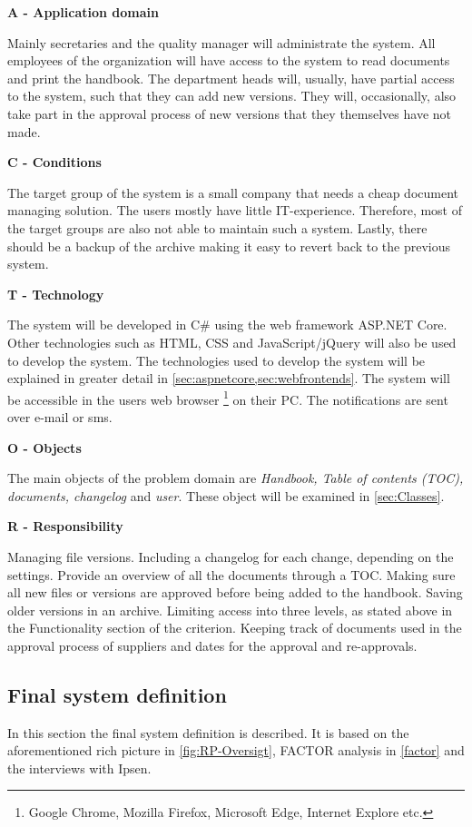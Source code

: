\noindent\textbf{A - Application domain}

Mainly secretaries and the quality manager will administrate the system.
All employees of the organization will have access to the system to read documents and print the handbook.
The department heads will, usually, have partial access to the system, such that they can add new versions.
They will, occasionally, also take part in the approval process of new versions that they themselves have not made.

\noindent\textbf{C - Conditions} \label{sec:conditions}

The target group of the system is a small company that needs a cheap document managing solution.
The users mostly have little IT-experience.
Therefore, most of the target groups are also not able to maintain such a system.
Lastly, there should be a backup of the archive making it easy to revert back to the previous system.

\noindent\textbf{T - Technology}

The system will be developed in C\# using the web framework ASP.NET Core.
Other technologies such as HTML, CSS and JavaScript/jQuery will also be used to develop the system.
The technologies used to develop the system will be explained in greater detail in \cref{sec:aspnetcore,sec:webfrontends}.
The system will be accessible in the users web browser \footnote{Google Chrome, Mozilla Firefox, Microsoft Edge, Internet Explore etc.} on their PC.
The notifications are sent over e-mail or sms.

\noindent\textbf{O - Objects}

The main objects of the problem domain are \textit{Handbook, Table of contents (TOC), documents, changelog} and \textit{user}.
These object will be examined in \cref{sec:Classes}.

\noindent\textbf{R  - Responsibility}

Managing file versions.
Including a changelog for each change, depending on the settings.
Provide an overview of all the documents through a TOC.
Making sure all new files or versions are approved before being added to the handbook.
Saving older versions in an archive.
Limiting access into three levels, as stated above in the Functionality section of the criterion.
Keeping track of documents used in the approval process of suppliers and dates for the approval and re-approvals.

\subsection{Final system definition}\label{sec:systemdefinition}
In this section the final system definition is described.
It is based on the aforementioned rich picture in \cref{fig:RP-Oversigt}, FACTOR analysis in \cref{factor} and the interviews with Ipsen.

